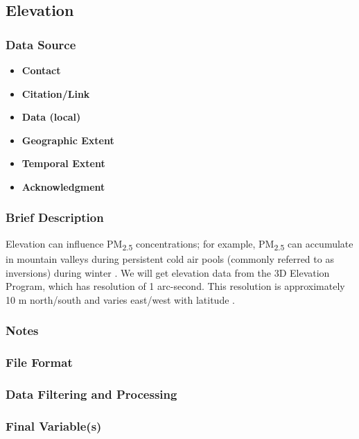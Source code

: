 \subsection{Elevation}
\subsubsection*{Data Source}
\begin{itemize}[nolistsep]
\item \textbf{Contact}
\item \textbf{Citation/Link}
\item \textbf{Data (local)}
\item \textbf{Geographic Extent}
\item \textbf{Temporal Extent}
\item \textbf{Acknowledgment}
\end{itemize}
\subsubsection*{Brief Description}

Elevation can influence PM\textsubscript{2.5} concentrations; for example, PM\textsubscript{2.5} can accumulate in mountain valleys during persistent cold air pools 
(commonly referred to as inversions) 
during winter \citep{Whiteman2014}. We will get elevation data from the 3D Elevation Program, which has resolution of 1 arc-second. This resolution is approximately 10 m north/south and varies east/west with latitude \citep{USGSElevation2017}.

\subsubsection*{Notes}
\subsubsection*{File Format}
\subsubsection*{Data Filtering and Processing}
\subsubsection*{Final Variable(s)}
